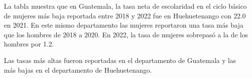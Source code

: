 \justifying La tabla muestra que en Guatemala, la tasa neta de escolaridad en el ciclo básico de mujeres más baja reportada entre 2018 y 2022 fue en Huehuetenango con 22.0 en 2021. En este mismo departamento las mujeres reportaron una tasa más baja que los hombres de 2018 a 2020. En 2022, la tasa de mujeres sobrepasó a la de los hombres por 1.2.

Las tasas más altas fueron reportadas en el departamento de Guatemala y las más bajas en el departamento de Huehuetenango.